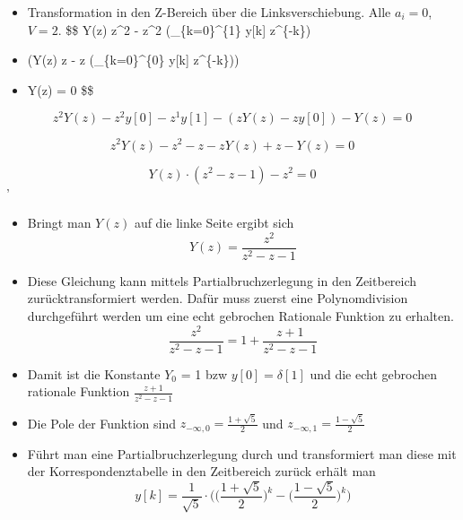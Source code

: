 \documentclass[11pt]{article}
\providecommand{\tightlist}{%
      \setlength{\itemsep}{0pt}\setlength{\parskip}{0pt}}
\begin{document}
    \begin{itemize}
\tightlist
\item
  Transformation in den Z-Bereich über die Linksverschiebung. Alle
  \(a_i = 0\), \(V = 2\). \$\$ Y(z) \cdot z\^{}2 - z\^{}2
  \cdot \big(\sum\_\{k=0\}\^{}\{1\} y{[}k{]} \cdot z\^{}\{-k\}\big)
\item
  (Y(z) \cdot z - z \cdot \big(\sum\_\{k=0\}\^{}\{0\} y{[}k{]}
  \cdot z\^{}\{-k\}\big))
\item
  Y(z) = 0 \$\$
\end{itemize}

    \[
    z^2 Y(z) - z^2 y[0] - z^1 y[1] 
    - (zY(z) - zy[0]) - Y(z)
    = 0
\]

    \[
    z^2 Y(z) - z^2 - z - zY(z) + z - Y(z) = 0
\]

    \[
    Y(z) \cdot (z^2 - z - 1) -z^2 = 0
\]'

    \begin{itemize}
\tightlist
\item
  Bringt man \(Y(z)\) auf die linke Seite ergibt sich \[
  Y(z) = \frac{z^2}{z^2 - z - 1}
  \]
\end{itemize}

    \begin{itemize}
\tightlist
\item
  Diese Gleichung kann mittels Partialbruchzerlegung in den Zeitbereich
  zurücktransformiert werden. Dafür muss zuerst eine Polynomdivision
  durchgeführt werden um eine echt gebrochen Rationale Funktion zu
  erhalten. \[
  \frac {z^2}{z^2 - z - 1} =  1 + \frac{z+1}{z^2 - z - 1}  
  \]
\end{itemize}

    \begin{itemize}
\tightlist
\item
  Damit ist die Konstante \(Y_0\) = 1 bzw \(y[0] = \delta[1]\) und die
  echt gebrochen rationale Funktion \(\frac{z + 1}{z^2 - z - 1}\)
\item
  Die Pole der Funktion sind \(z_{-\infty,0} = \frac{1+\sqrt{5}}{2}\)
  und \(z_{-\infty,1} = \frac{1-\sqrt{5}}{2}\)
\end{itemize}

    \begin{itemize}
\tightlist
\item
  Führt man eine Partialbruchzerlegung durch und transformiert man diese
  mit der Korrespondenztabelle in den Zeitbereich zurück erhält man \[
  y[k] 
  = \frac{1}{\sqrt{5}} \cdot 
      \bigg( 
          \big( \frac{1+\sqrt{5}}{2} \big)^k 
          -
          \big( \frac{1-\sqrt{5}}{2} \big)^k             
      \bigg)        
  \]
\end{itemize}
\end{document}
